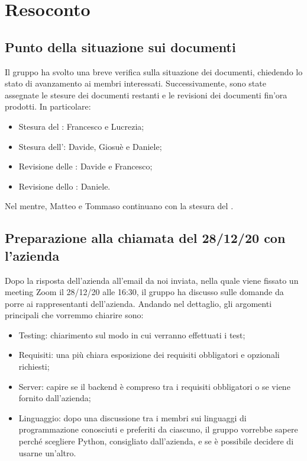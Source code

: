 \section{Resoconto}

\subsection{Punto della situazione sui documenti}

Il gruppo \gruppo{} ha svolto una breve verifica sulla situazione dei documenti, chiedendo lo stato di avanzamento ai membri interessati. Successivamente, sono state assegnate le stesure dei documenti restanti e le revisioni dei documenti fin'ora prodotti. In particolare:
\begin{itemize}
\item Stesura del \PdQ{}: Francesco e Lucrezia;
\item Stesura dell'\AdR{}: Davide, Giosuè e Daniele;
\item Revisione delle \NdP{}: Davide e Francesco;
\item Revisione dello \SdF{}: Daniele.
\end{itemize}
Nel mentre, Matteo e Tommaso continuano con la stesura del \PdP{}.


\subsection{Preparazione alla chiamata del 28/12/20 con l'azienda}

Dopo la risposta dell'azienda all'email da noi inviata, nella quale viene fissato un meeting Zoom il 28/12/20 alle 16:30, il gruppo ha discusso sulle domande da porre ai rappresentanti dell'azienda. Andando nel dettaglio, gli argomenti principali che vorremmo chiarire sono:
\begin{itemize}

\item Testing: chiarimento sul modo in cui verranno effettuati i test;

\item Requisiti: una più chiara esposizione dei requisiti obbligatori e opzionali richiesti;

\item Server: capire se il backend è compreso tra i requisiti obbligatori o se viene fornito dall'azienda;

\item Linguaggio: dopo una discussione tra i membri sui linguaggi di programmazione conosciuti e preferiti da ciascuno, il gruppo vorrebbe sapere perché scegliere Python, consigliato dall'azienda, e se è possibile decidere di usarne un'altro.

\end{itemize}


